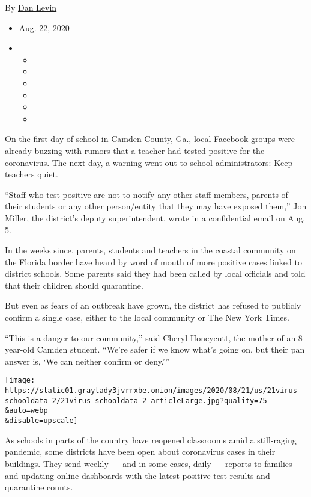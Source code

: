 By \href{https://www.nytimes3xbfgragh.onion/by/dan-levin}{Dan Levin}

\begin{itemize}
\item
  Aug. 22, 2020
\item
  \begin{itemize}
  \item
  \item
  \item
  \item
  \item
  \item
  \end{itemize}
\end{itemize}

On the first day of school in Camden County, Ga., local Facebook groups
were already buzzing with rumors that a teacher had tested positive for
the coronavirus. The next day, a warning went out to
\href{https://www.nytimes3xbfgragh.onion/2020/09/08/nyregion/hartford-schools-ransomware.html}{school}
administrators: Keep teachers quiet.

``Staff who test positive are not to notify any other staff members,
parents of their students or any other person/entity that they may have
exposed them,'' Jon Miller, the district's deputy superintendent, wrote
in a confidential email on Aug. 5.

In the weeks since, parents, students and teachers in the coastal
community on the Florida border have heard by word of mouth of more
positive cases linked to district schools. Some parents said they had
been called by local officials and told that their children should
quarantine.

But even as fears of an outbreak have grown, the district has refused to
publicly confirm a single case, either to the local community or The New
York Times.

``This is a danger to our community,'' said Cheryl Honeycutt, the mother
of an 8-year-old Camden student. ``We're safer if we know what's going
on, but their pan answer is, `We can neither confirm or deny.'''

\texttt{[image: https://static01.graylady3jvrrxbe.onion/images/2020/08/21/us/21virus-schooldata-2/21virus-schooldata-2-articleLarge.jpg?quality=75\\\&auto=webp\\\&disable=upscale]}

As schools in parts of the country have reopened classrooms amid a
still-raging pandemic, some districts have been open about coronavirus
cases in their buildings. They send weekly --- and
\href{https://www.cherokeek12.net/Content2/covid-letters-archive}{in
some cases, daily} --- reports to families and
\href{https://www.cherokeek12.net/Content2/casestatusreport}{updating
online dashboards} with the latest positive test results and quarantine
counts.

